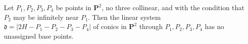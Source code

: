Let $P_1, P_2, P_3, P_4$ be points in $\mathbf{P}^2$, no three collinear, and with the condition that $P_2$ may be infinitely near $P_1$. Then the linear system $\mathfrak{d} = |2H - P_1 - P_2 - P_3 - P_4|$ of conics in $\mathbf{P}^2$ through $P_1, P_2, P_3, P_4$ has no unassigned base points.
